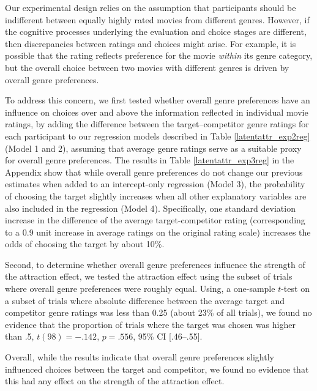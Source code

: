 \documentclass[12pt, a4paper]{article}
\begin{document}
Our experimental design relies on the assumption that participants should be indifferent between equally highly rated movies from different genres. However, if the cognitive processes underlying the evaluation and choice stages are different, then discrepancies between ratings and choices might arise. For example, it is possible that the rating reflects preference for the movie \textit{within} its genre category, but the overall choice between two movies with different genres is driven by overall genre preferences.


To address this concern, we first tested whether overall genre preferences have an influence on choices over and above the information reflected in individual movie ratings, by adding the difference between the target–competitor genre ratings for each participant to our regression models described in Table \ref{latentattr_exp2reg} (Model 1 and 2), assuming that average genre ratings serve as a suitable proxy for overall genre preferences. The results in Table \ref{latentattr_exp3reg} in the Appendix show that while overall genre preferences do not change our previous estimates when added to an intercept-only regression (Model 3), the probability of choosing the target slightly increases when all other explanatory variables are also included in the regression (Model 4). Specifically, one standard deviation increase in the difference of the average target-competitor rating (corresponding to a 0.9 unit increase in average ratings on the original rating scale) increases the odds of choosing the target by about 10\%.  
 

Second, to determine whether overall genre preferences influence the strength of the attraction effect, we tested the attraction effect using the subset of trials where overall genre preferences were roughly equal. Using, a one-sample $t$-test on a subset of trials where absolute difference between the average target and competitor genre ratings was less than 0.25 (about 23\% of all trials), we found no evidence that the proportion of trials where the target was chosen was higher than .5, $t(98)=-.142$, $p=.556$, 95\% CI [.46--.55].
  
Overall, while the results indicate that overall genre preferences slightly influenced choices between the target and competitor, we found no evidence that this had any effect on the strength of the attraction effect.
\end{document}
